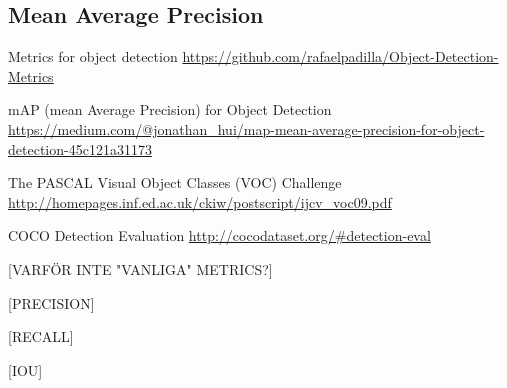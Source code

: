 \subsection{Mean Average Precision}
Metrics for object detection
\url{https://github.com/rafaelpadilla/Object-Detection-Metrics}

mAP (mean Average Precision) for Object Detection
\url{https://medium.com/@jonathan_hui/map-mean-average-precision-for-object-detection-45c121a31173}

The PASCAL Visual Object Classes (VOC) Challenge
\url{http://homepages.inf.ed.ac.uk/ckiw/postscript/ijcv_voc09.pdf}

COCO Detection Evaluation
\url{http://cocodataset.org/#detection-eval}

[VARFÖR INTE "VANLIGA" METRICS?]

[PRECISION]

[RECALL]

[IOU]

\newpage
